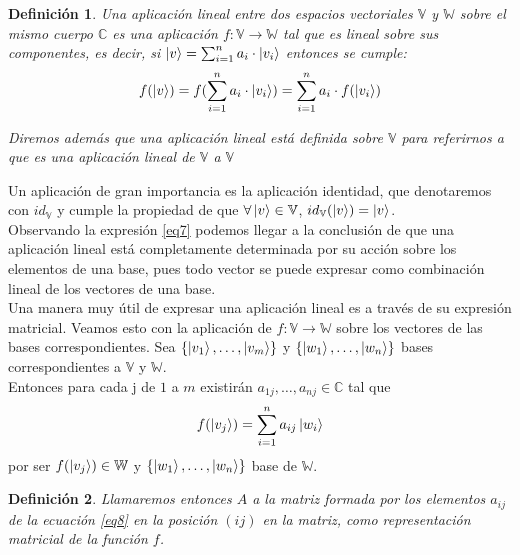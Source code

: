 \documentclass[a4paper]{article}
\newtheorem{deff}{Definición}[section]
\numberwithin{equation}{section}
\begin{document}
\begin{deff} Una aplicación lineal entre dos espacios vectoriales $\mathbb{V}$ y $\mathbb{W}$ sobre el mismo cuerpo $\mathbb{C}$ es una aplicación $f: \mathbb{V} \longrightarrow \mathbb{W}$ tal que es lineal sobre sus componentes, es decir, si $\ket{v} = \sum_{i=1}^n a_i \cdot \ket{v_i}$ entonces se cumple:
\begin{equation} \label{eq7}
f(\ket{v}) = f(\sum_{i=1}^n a_i \cdot \ket{v_i}) = \sum_{i=1}^n a_i \cdot f(\ket{v_i})
\end{equation}

Diremos además que una aplicación lineal está definida sobre $\mathbb{V}$ para referirnos a que es una aplicación lineal de $\mathbb{V}$ a $\mathbb{V}$
\end{deff}
Un aplicación de gran importancia es la aplicación identidad, que denotaremos con $id_{\mathbb{V}}$ y cumple la propiedad de que $\forall \ket{v}\in\mathbb{V}$, $id_{\mathbb{V}}(\ket{v}) = \ket{v}$.
\\
Observando la expresión \ref{eq7} podemos llegar a la conclusión de que una aplicación lineal está completamente determinada por su acción sobre los elementos de una base, pues todo vector se puede expresar como combinación lineal de los vectores de una base.
\\
Una manera muy útil de expresar una aplicación lineal es a través de su expresión matricial. Veamos esto con la aplicación de $f:\mathbb{V} \longrightarrow \mathbb{W}$ sobre los vectores de las bases correspondientes. Sea $\{ \ket{v_1}, \ldots, \ket{v_m} \}$ y $\{ \ket{w_1}, \ldots, \ket{w_n} \}$ bases correspondientes a $\mathbb{V}$ y $\mathbb{W}$.
\\
Entonces para cada j de $1$ a $m$ existirán $a_{1j}, \ldots, a_{nj} \in \mathbb{C}$ tal que
\begin{equation} \label{eq8}
f(\ket{v_j}) = \sum_{i=1}^n a_{ij} \ket{w_i}
\end{equation}
por ser $f(\ket{v_j}) \in \mathbb{W}$ y $\{ \ket{w_1}, \ldots, \ket{w_n} \}$ base de $\mathbb{W}$.

\begin{deff}Llamaremos entonces $A$ a la matriz formada por los elementos $a_{ij}$ de la ecuación \ref{eq8} en la posición $(ij)$ en la matriz, como representación matricial de la función $f$.
\end{deff}
\end{document}
